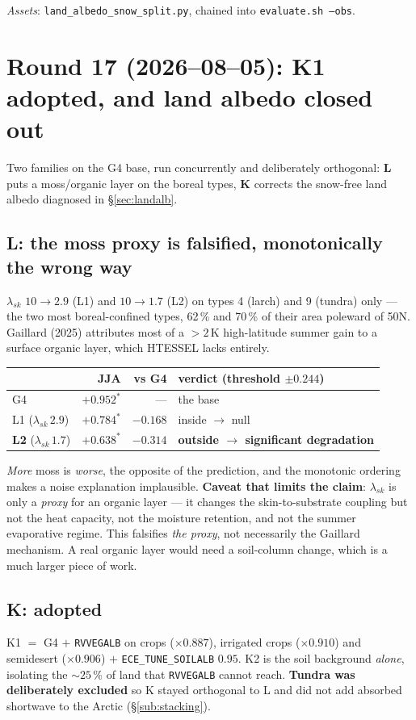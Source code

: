\documentclass[10pt]{article}
\begin{document}
\emph{Assets}: \texttt{land\_albedo\_snow\_split.py}, chained into \texttt{evaluate.sh --obs}.

\section{Round 17 (2026--08--05): K1 adopted, and land albedo closed out}\label{sec:r17}
Two families on the G4 base, run concurrently and deliberately orthogonal: \textbf{L} puts a
moss/organic layer on the boreal types, \textbf{K} corrects the snow-free land albedo
diagnosed in \S\ref{sec:landalb}.

\subsection{L: the moss proxy is falsified, monotonically the wrong way}\label{sub:r17l}
$\lambda_{sk}$ $10\to2.9$ (L1) and $10\to1.7$ (L2) on types 4 (larch) and 9 (tundra) only ---
the two most boreal-confined types, 62\,\% and 70\,\% of their area poleward of 50N. Gaillard
(2025) attributes most of a ${>}2$\,K high-latitude summer gain to a surface organic layer,
which HTESSEL lacks entirely.

\begin{center}\footnotesize
\begin{tabular}{l r r l}
\toprule
 & JJA & vs G4 & verdict (threshold $\pm0.244$) \\
\midrule
G4 & $+0.952^*$ & --- & the base \\
L1 ($\lambda_{sk}\,2.9$) & $+0.784^*$ & $-0.168$ & inside $\to$ null \\
\textbf{L2} ($\lambda_{sk}\,1.7$) & $+0.638^*$ & $\mathbf{-0.314}$ & \textbf{outside $\to$ significant degradation} \\
\bottomrule
\end{tabular}
\end{center}

\noindent \emph{More} moss is \emph{worse}, the opposite of the prediction, and the monotonic
ordering makes a noise explanation implausible. \textbf{Caveat that limits the claim}:
$\lambda_{sk}$ is only a \emph{proxy} for an organic layer --- it changes the skin-to-substrate
coupling but not the heat capacity, not the moisture retention, and not the summer
evaporative regime. This falsifies \emph{the proxy}, not necessarily the Gaillard mechanism.
A real organic layer would need a soil-column change, which is a much larger piece of work.

\subsection{K: adopted}\label{sub:r17k}
K1 $=$ G4 $+$ \texttt{RVVEGALB} on crops ($\times0.887$), irrigated crops ($\times0.910$) and
semidesert ($\times0.906$) $+$ \texttt{ECE\_TUNE\_SOILALB} $0.95$. K2 is the soil background
\emph{alone}, isolating the ${\sim}25\,\%$ of land that \texttt{RVVEGALB} cannot reach.
\textbf{Tundra was deliberately excluded} so K stayed orthogonal to L and did not add
absorbed shortwave to the Arctic (\S\ref{sub:stacking}).
\end{document}

